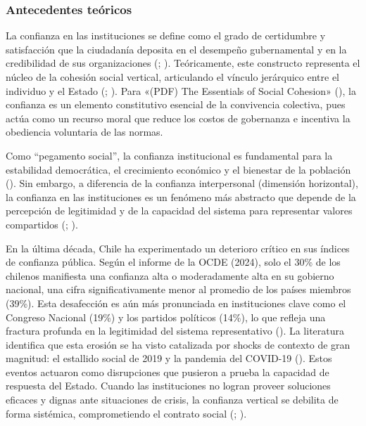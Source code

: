 \documentclass[
  spanish,
  a4paper,
  oneside]{scrbook}
\begin{document}
\subsubsection{Antecedentes teóricos}\label{antecedentes-teuxf3ricos}

La confianza en las instituciones se define como el grado de certidumbre
y satisfacción que la ciudadanía deposita en el desempeño gubernamental
y en la credibilidad de sus organizaciones
(;
). Teóricamente, este constructo representa
el núcleo de la cohesión social vertical, articulando el vínculo
jerárquico entre el individuo y el Estado
(;
). Para {«({PDF}) {The Essentials}
of {Social Cohesion}»} (), la
confianza es un elemento constitutivo esencial de la convivencia
colectiva, pues actúa como un recurso moral que reduce los costos de
gobernanza e incentiva la obediencia voluntaria de las normas.

Como ``pegamento social'', la confianza institucional es fundamental
para la estabilidad democrática, el crecimiento económico y el bienestar
de la población (). Sin
embargo, a diferencia de la confianza interpersonal (dimensión
horizontal), la confianza en las instituciones es un fenómeno más
abstracto que depende de la percepción de legitimidad y de la capacidad
del sistema para representar valores compartidos
(; ).

En la última década, Chile ha experimentado un deterioro crítico en sus
índices de confianza pública. Según el informe de la OCDE (2024), solo
el 30\% de los chilenos manifiesta una confianza alta o moderadamente
alta en su gobierno nacional, una cifra significativamente menor al
promedio de los países miembros (39\%). Esta desafección es aún más
pronunciada en instituciones clave como el Congreso Nacional (19\%) y
los partidos políticos (14\%), lo que refleja una fractura profunda en
la legitimidad del sistema representativo
(). La literatura identifica que esta erosión
se ha visto catalizada por shocks de contexto de gran magnitud: el
estallido social de 2019 y la pandemia del COVID-19
(). Estos eventos actuaron como disrupciones
que pusieron a prueba la capacidad de respuesta del Estado. Cuando las
instituciones no logran proveer soluciones eficaces y dignas ante
situaciones de crisis, la confianza vertical se debilita de forma
sistémica, comprometiendo el contrato social
(;
).
\end{document}
